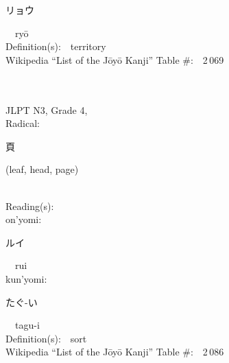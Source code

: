 \begin{multicols}{2}
{\hspace*{2em}}{\begin{CJK}{UTF8}{min} リョウ \end{CJK}}\ \ ry\=o\ \ \\
Definition(s):\ \ territory \\
Wikipedia ``List of the J\=oy\=o Kanji'' Table \#:\ \ 2\,069 \\
\ \ \\
{\fontsize{34pt}{40pt}  }\ \ \\  %
{JLPT N3, Grade 4, \\Radical:\ \ {\begin{CJK}{UTF8}{min} 頁 \end{CJK}} (leaf, head, page) } \\
Reading(s):\ \ \\
{\hspace*{1em}}on'yomi:\ \ \\
{\hspace*{2em}}{\begin{CJK}{UTF8}{min} ルイ \end{CJK}}\ \ rui\ \ \\
{\hspace*{1em}}kun'yomi:\ \ \\
{\hspace*{2em}}{\begin{CJK}{UTF8}{min} たぐ-い \end{CJK}}\ \ tagu-i\ \ \\
Definition(s):\ \ sort \\
Wikipedia ``List of the J\=oy\=o Kanji'' Table \#:\ \ 2\,086 \\
\ \ \\
\end{multicols}



